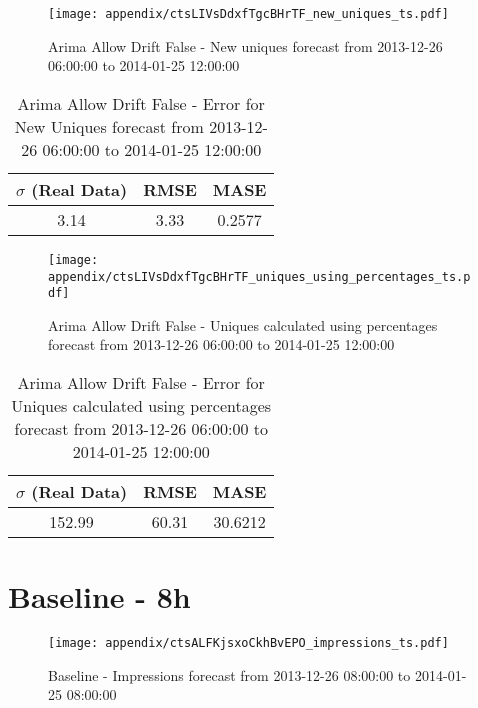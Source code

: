 \begin{figure}[H] \begin{center} \leavevmode
\texttt{[image: appendix/ctsLIVsDdxfTgcBHrTF\_new\_uniques\_ts.pdf]} \caption{
Arima Allow Drift False - New uniques forecast from 2013-12-26 06:00:00 to 2014-01-25 12:00:00} \label{fig:appendix/ctsLIVsDdxfTgcBHrTF_new_uniques_ts.pdf} \end{center}
\end{figure}

\begin{table}[H]
\centering
\footnotesize
\begin{tabular}{ccc}
$\sigma$ (Real Data) & RMSE & MASE   \\ \hline
3.14 & 3.33 & 0.2577 \\
\end{tabular}

\vspace{0.5cm}

\caption{
Arima Allow Drift False - Error for New Uniques forecast from 2013-12-26 06:00:00 to 2014-01-25 12:00:00}
\end{table}

\begin{figure}[H] \begin{center} \leavevmode
\texttt{[image: appendix/ctsLIVsDdxfTgcBHrTF\_uniques\_using\_percentages\_ts.pdf]} \caption{
Arima Allow Drift False - Uniques calculated using percentages forecast from 2013-12-26 06:00:00 to 2014-01-25 12:00:00} \label{fig:appendix/ctsLIVsDdxfTgcBHrTF_uniques_using_percentages_ts.pdf} \end{center}
\end{figure}

\begin{table}[H]
\centering
\footnotesize
\begin{tabular}{ccc}
$\sigma$ (Real Data) & RMSE & MASE   \\ \hline
152.99 & 60.31 & 30.6212 \\
\end{tabular}

\vspace{0.5cm}

\caption{
Arima Allow Drift False - Error for Uniques calculated using percentages forecast from 2013-12-26 06:00:00 to 2014-01-25 12:00:00}
\end{table}

\section{Baseline - 8h}
\begin{figure}[H] \begin{center} \leavevmode
\texttt{[image: appendix/ctsALFKjsxoCkhBvEPO\_impressions\_ts.pdf]} \caption{
Baseline - Impressions forecast from 2013-12-26 08:00:00 to 2014-01-25 08:00:00} \label{fig:appendix/ctsALFKjsxoCkhBvEPO_impressions_ts.pdf} \end{center}
\end{figure}

